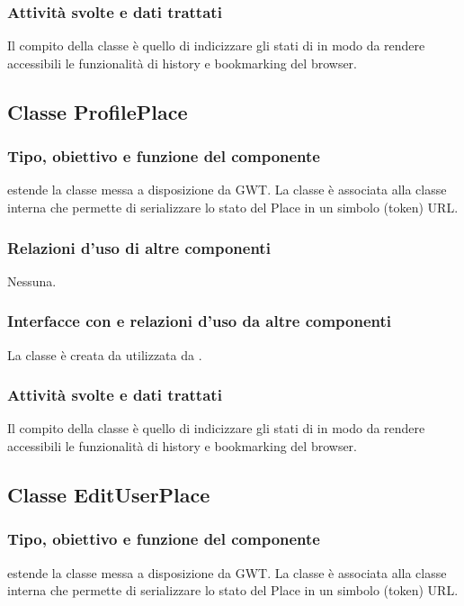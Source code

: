 \subsubsection*{Attivit\`a svolte e dati trattati}
Il compito della classe \`e quello di indicizzare gli stati di
 in modo da rendere accessibili le funzionalit\`a di history e
bookmarking del browser.

\subsection{Classe ProfilePlace}
\subsubsection*{Tipo, obiettivo e funzione del componente}
 estende la classe  messa a disposizione da GWT. La
classe \`e associata alla classe interna  che permette di
serializzare lo stato del Place in un simbolo (token) URL.
\subsubsection*{Relazioni d'uso di altre componenti}
Nessuna.
\subsubsection*{Interfacce con e relazioni d'uso da altre componenti}
La classe \`e creata da  utilizzata da .
\subsubsection*{Attivit\`a svolte e dati trattati}
Il compito della classe \`e quello di indicizzare gli stati di
 in modo da rendere accessibili le funzionalit\`a di history
e bookmarking del browser.

\subsection{Classe EditUserPlace}
\subsubsection*{Tipo, obiettivo e funzione del componente}
 estende la classe  messa a disposizione da GWT. La
classe \`e associata alla classe interna  che permette di
serializzare lo stato del Place in un simbolo (token) URL.
